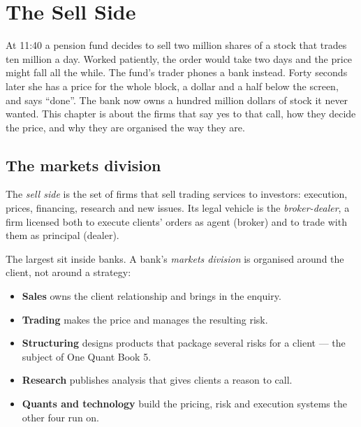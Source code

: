 \chapter{The Sell Side}\label{ch:m1:the-sell-side}

At 11:40 a pension fund decides to sell two million shares of a stock that
trades ten million a day. Worked patiently, the order would take two days and
the price might fall all the while. The fund's trader phones a bank instead.
Forty seconds later she has a price for the whole block, a dollar and a half
below the screen, and says ``done''. The bank now owns a hundred million
dollars of stock it never wanted. This chapter is about the firms that say
yes to that call, how they decide the price, and why they are organised the
way they are.

\section{The markets division}

\begin{definition}\label{def:m1:the-sell-side:sell-side}
The \emph{sell side} is the set of firms that sell trading
services to investors: execution, prices, financing, research and new
issues. Its legal vehicle is the \emph{broker-dealer}, a
firm licensed both to execute clients' orders as agent (broker) and to trade
with them as principal (dealer).
\end{definition}

The largest  sit inside banks. A bank's \emph{markets
division} is organised around the client, not around a strategy:

\begin{itemize}
\item \textbf{Sales} owns the client relationship and brings in the enquiry.
\item \textbf{Trading} makes the price and manages the resulting risk.
\item \textbf{Structuring} designs products that package several risks for a
  client --- the subject of One Quant Book 5.
\item \textbf{Research} publishes analysis that gives clients a reason to
  call.
\item \textbf{Quants and technology} build the pricing, risk and execution
  systems the other four run on.
\end{itemize}


